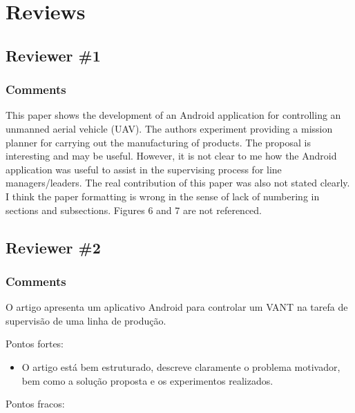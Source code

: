 \documentclass[12pt]{article}
\begin{document}
\setcounter{secnumdepth}{0}

\section{Reviews}

\subsection{Reviewer \#1}

\subsubsection{Comments}

This paper shows the development of an Android application for controlling an unmanned aerial vehicle (UAV). The authors experiment providing a mission planner for carrying out  the manufacturing of products. The proposal is interesting and may be useful. However, it is not clear to me how the Android application was useful to assist in the supervising process for line managers/leaders. The real contribution of this paper was also not stated clearly. I think the paper formatting is wrong in the sense of lack of numbering in sections and subsections. Figures 6 and 7 are not referenced.

\subsection{Reviewer \#2}

\subsubsection{Comments}

O artigo apresenta um aplicativo Android para controlar um VANT na tarefa de supervisão de uma linha de produção.

Pontos fortes:

\begin{itemize}
\item O artigo está bem estruturado, descreve claramente o problema motivador, bem como a solução proposta e os experimentos realizados.
\end{itemize}

Pontos fracos:
\end{document}
